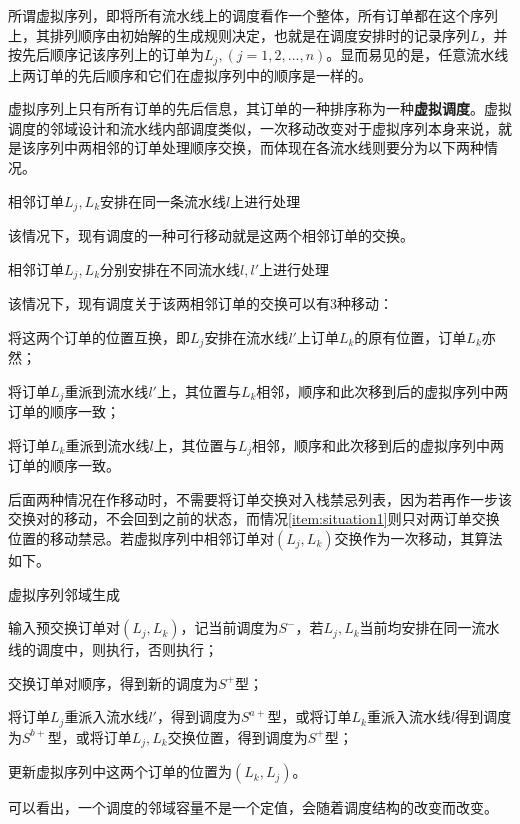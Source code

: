 所谓虚拟序列，即将所有流水线上的调度看作一个整体，所有订单都在这个序列上，其排列顺序由初始解的生成规则决定，也就是在调度安排时的记录序列$L$，并按先后顺序记该序列上的订单为$L_j, (j = 1,2,...,n)$。显而易见的是，任意流水线上两订单的先后顺序和它们在虚拟序列中的顺序是一样的。

虚拟序列上只有所有订单的先后信息，其订单的一种排序称为一种\textbf{虚拟调度}。虚拟调度的邻域设计和流水线内部调度类似，一次移动改变对于虚拟序列本身来说，就是该序列中两相邻的订单处理顺序交换，而体现在各流水线则要分为以下两种情况。
\begin{asparaenum}
\item 相邻订单$L_j, L_k$安排在同一条流水线$l$上进行处理

该情况下，现有调度的一种可行移动就是这两个相邻订单的交换。
\item 相邻订单$L_j, L_k$分别安排在不同流水线$l, l'$上进行处理
\end{asparaenum}

该情况下，现有调度关于该两相邻订单的交换可以有$3$种移动：
\begin{inparaenum}
\renewcommand{\theenumi}{\protect\setcounter{local}{171 + \the\value{enumi}}\protect\ding{\value{local}}}
\renewcommand{\labelenumi}{\theenumi}
\item 将这两个订单的位置互换，即$L_j$安排在流水线$l'$上订单$L_k$的原有位置，订单$L_k$亦然\label{item:situation1}；
\item 将订单$L_j$重派到流水线$l'$上，其位置与$L_k$相邻，顺序和此次移到后的虚拟序列中两订单的顺序一致；
\item 将订单$L_k$重派到流水线$l$上，其位置与$L_j$相邻，顺序和此次移到后的虚拟序列中两订单的顺序一致。
\end{inparaenum}

后面两种情况在作移动时，不需要将订单交换对入栈禁忌列表，因为若再作一步该交换对的移动，不会回到之前的状态，而情况\ref{item:situation1}则只对两订单交换位置的移动禁忌。若虚拟序列中相邻订单对$(L_j, L_k)$交换作为一次移动，其算法如下。
\begin{algori}
虚拟序列邻域生成\label{alg:vituralneighbor}
\begin{asparaenum}
\renewcommand{\labelenumi}{\bf Step\theenumi~}
\item 输入预交换订单对$(L_j, L_k)$，记当前调度为$S^-$，若$L_j, L_k$当前均安排在同一流水线的调度中，则执行，否则执行；
\item 交换订单对顺序，得到新的调度为$S^+$型；
\item 将订单$L_j$重派入流水线$l'$，得到调度为$S^{a+}$型，或将订单$L_k$重派入流水线$l$得到调度为$S^{b+}$型，或将订单$L_j, L_k$交换位置，得到调度为$S^+$型；
\item 更新虚拟序列中这两个订单的位置为$(L_k, L_j)$。
\end{asparaenum}
\end{algori}
可以看出，一个调度的邻域容量不是一个定值，会随着调度结构的改变而改变。

